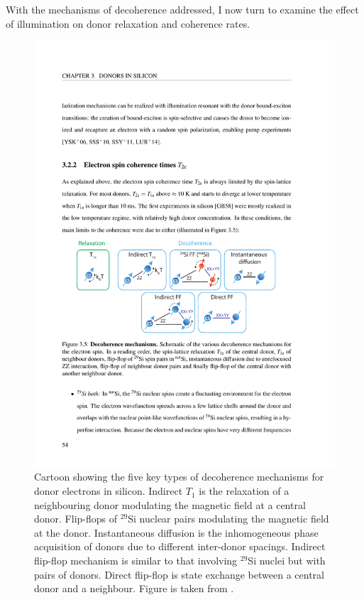 With the mechanisms of decoherence addressed, I now turn to examine the effect of illumination on donor relaxation and coherence rates.

\begin{figure}
\centering
\includegraphics[width = \columnwidth]{Figures/decoherenceTypes.pdf}
\caption[Decoherence mechanisms in silicon]{Cartoon showing the five key types of decoherence mechanisms for donor electrons in silicon. Indirect $T_1$ is the relaxation of a neighbouring donor modulating the magnetic field at a central donor. Flip-flops of $^{29}$Si nuclear pairs modulating the magnetic field at the donor. Instantaneous diffusion is the inhomogeneous phase acquisition of donors due to different inter-donor spacings. Indirect flip-flop mechanism is similar to that involving $^{29}$Si nuclei but with pairs of donors. Direct flip-flop is state exchange between a central donor and a neighbour. Figure is taken from \cite{Wolfowicz2015a}.}
\label{fig:decoherenceTypes}
\end{figure}



